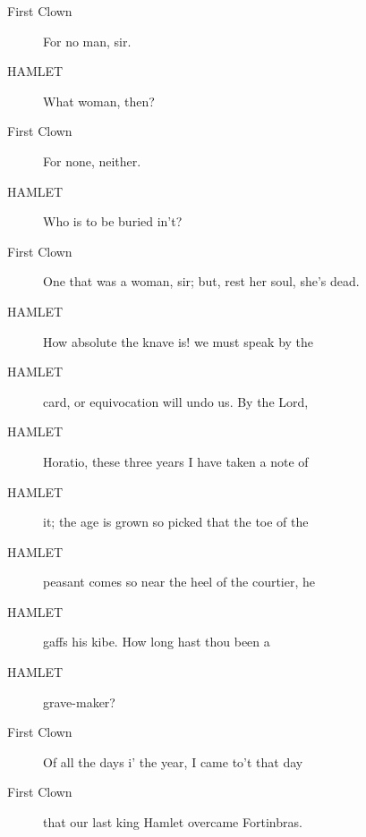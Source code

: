 \documentclass{article}
\begin{document}
\begin{description}
            
\item[First Clown] For no man, sir.
\end{description}
          
\begin{description}
            
\item[HAMLET] What woman, then?
\end{description}
          
\begin{description}
            
\item[First Clown] For none, neither.
\end{description}
          
\begin{description}
            
\item[HAMLET] Who is to be buried in't?
\end{description}
          
\begin{description}
            
\item[First Clown] One that was a woman, sir; but, rest her soul, she's dead.
\end{description}
          
\begin{description}
            
\item[HAMLET] How absolute the knave is! we must speak by the
\item[HAMLET] card, or equivocation will undo us. By the Lord,
\item[HAMLET] Horatio, these three years I have taken a note of
\item[HAMLET] it; the age is grown so picked that the toe of the
\item[HAMLET] peasant comes so near the heel of the courtier, he
\item[HAMLET] gaffs his kibe. How long hast thou been a
\item[HAMLET] grave-maker?
\end{description}
          
\begin{description}
            
\item[First Clown] Of all the days i' the year, I came to't that day
\item[First Clown] that our last king Hamlet overcame Fortinbras.
\end{description}
          
\end{document}
